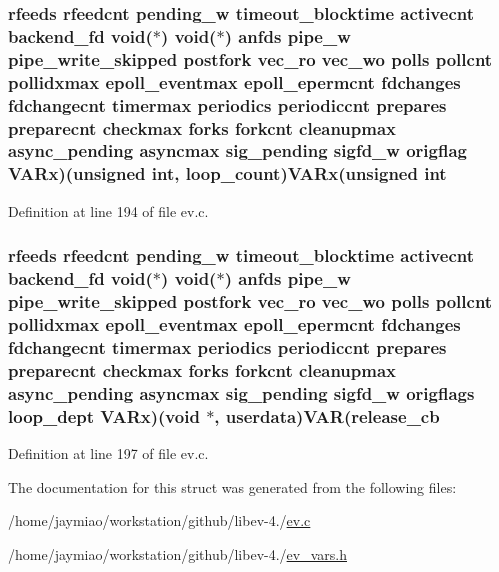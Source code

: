 \hypertarget{structev__loop_a771db3357ce44a7c079995398180ba61}{
\subsubsection[{\-V\-A\-Rx}]{ {\bf rfeeds} {\bf rfeedcnt} {\bf pending\-\_\-w} {\bf timeout\-\_\-blocktime} {\bf activecnt} {\bf backend\-\_\-fd} void($\ast$) void($\ast$) {\bf anfds} {\bf pipe\-\_\-w} {\bf pipe\-\_\-write\-\_\-skipped} {\bf postfork} {\bf vec\-\_\-ro} {\bf vec\-\_\-wo} {\bf polls} {\bf pollcnt} {\bf pollidxmax} {\bf epoll\-\_\-eventmax} {\bf epoll\-\_\-epermcnt} {\bf fdchanges} {\bf fdchangecnt} {\bf timermax} {\bf periodics} {\bf periodiccnt} {\bf prepares} {\bf preparecnt} {\bf checkmax} {\bf forks} {\bf forkcnt} {\bf cleanupmax} {\bf async\-\_\-pending} {\bf asyncmax} {\bf sig\-\_\-pending} {\bf sigfd\-\_\-w} origflag {\bf \-V\-A\-Rx})(unsigned int, {\bf loop\-\_\-count}){\bf \-V\-A\-Rx}(unsigned int}}\label{structev__loop_a771db3357ce44a7c079995398180ba61}


\-Definition at line 194 of file ev.\-c.

\hypertarget{structev__loop_a502f06942cf02fd47d500dc6a3655879}{
\subsubsection[{\-V\-A\-Rx}]{ {\bf rfeeds} {\bf rfeedcnt} {\bf pending\-\_\-w} {\bf timeout\-\_\-blocktime} {\bf activecnt} {\bf backend\-\_\-fd} void($\ast$) void($\ast$) {\bf anfds} {\bf pipe\-\_\-w} {\bf pipe\-\_\-write\-\_\-skipped} {\bf postfork} {\bf vec\-\_\-ro} {\bf vec\-\_\-wo} {\bf polls} {\bf pollcnt} {\bf pollidxmax} {\bf epoll\-\_\-eventmax} {\bf epoll\-\_\-epermcnt} {\bf fdchanges} {\bf fdchangecnt} {\bf timermax} {\bf periodics} {\bf periodiccnt} {\bf prepares} {\bf preparecnt} {\bf checkmax} {\bf forks} {\bf forkcnt} {\bf cleanupmax} {\bf async\-\_\-pending} {\bf asyncmax} {\bf sig\-\_\-pending} {\bf sigfd\-\_\-w} {\bf origflags} loop\-\_\-dept {\bf \-V\-A\-Rx})(void $\ast$, {\bf userdata}){\bf \-V\-A\-R}({\bf release\-\_\-cb}}}\label{structev__loop_a502f06942cf02fd47d500dc6a3655879}


\-Definition at line 197 of file ev.\-c.



\-The documentation for this struct was generated from the following files\-:\begin{DoxyCompactItemize}
\item 
/home/jaymiao/workstation/github/libev-\/4./\hyperlink{ev_8c}{ev.\-c}\item 
/home/jaymiao/workstation/github/libev-\/4./\hyperlink{ev__vars_8h}{ev\-\_\-vars.\-h}\end{DoxyCompactItemize}
